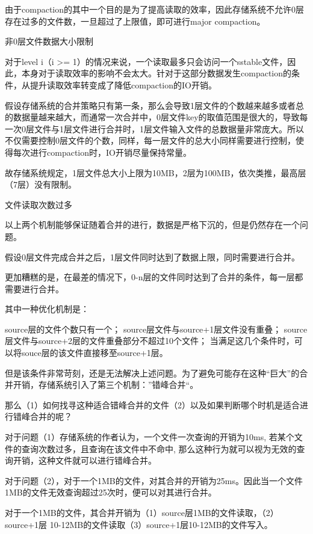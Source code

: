 \begin{enumerate}
\begin{enumerate}
\begin{enumerate}
				
				由于compaction的其中一个目的是为了提高读取的效率，因此存储系统不允许0层存在过多的文件数，一旦超过了上限值，即可进行major compaction。
				
				非0层文件数据大小限制
				
				对于level i（i >= 1）的情况来说，一个读取最多只会访问一个sstable文件，因此，本身对于读取效率的影响不会太大。针对于这部分数据发生compaction的条件，从提升读取效率转变成了降低compaction的IO开销。
				
				假设存储系统的合并策略只有第一条，那么会导致1层文件的个数越来越多或者总的数据量越来越大，而通常一次合并中，0层文件key的取值范围是很大的，导致每一次0层文件与1层文件进行合并时，1层文件输入文件的总数据量非常庞大。所以不仅需要控制0层文件的个数，同样，每一层文件的总大小同样需要进行控制，使得每次进行compaction时，IO开销尽量保持常量。
				
				故存储系统规定，1层文件总大小上限为10MB，2层为100MB，依次类推，最高层（7层）没有限制。
				
				文件读取次数过多
				
				以上两个机制能够保证随着合并的进行，数据是严格下沉的，但是仍然存在一个问题。
				
				假设0层文件完成合并之后，1层文件同时达到了数据上限，同时需要进行合并。
				
				更加糟糕的是，在最差的情况下，0-n层的文件同时达到了合并的条件，每一层都需要进行合并。
				
				其中一种优化机制是：
				
				source层的文件个数只有一个；
				source层文件与source+1层文件没有重叠；
				source层文件与source+2层的文件重叠部分不超过10个文件；
				当满足这几个条件时，可以将souce层的该文件直接移至source+1层。
				
				但是该条件非常苛刻，还是无法解决上述问题。为了避免可能存在这种“巨大”的合并开销，存储系统引入了第三个机制：”错峰合并“。
				
				那么（1）如何找寻这种适合错峰合并的文件（2）以及如果判断哪个时机是适合进行错峰合并的呢？
				
				对于问题（1）存储系统的作者认为，一个文件一次查询的开销为10ms, 若某个文件的查询次数过多，且查询在该文件中不命中, 那么这种行为就可以视为无效的查询开销，这种文件就可以进行错峰合并。
				
				对于问题（2），对于一个1MB的文件，对其合并的开销为25ms。因此当一个文件1MB的文件无效查询超过25次时，便可以对其进行合并。
				
				对于一个1MB的文件，其合并开销为（1）source层1MB的文件读取，（2）source+1层 10-12MB的文件读取（3）source+1层10-12MB的文件写入。
				

\end{enumerate}
\end{enumerate}
\end{enumerate}
